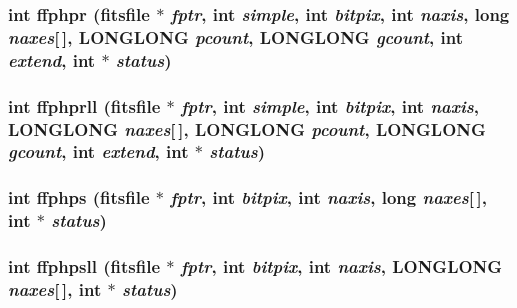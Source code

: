 \subsubsection{\setlength{\rightskip}{0pt plus 5cm}int ffphpr (\bf{fitsfile} $\ast$ {\em fptr}, int {\em simple}, int {\em bitpix}, int {\em naxis}, long {\em naxes}[$\,$], \bf{LONGLONG} {\em pcount}, \bf{LONGLONG} {\em gcount}, int {\em extend}, int $\ast$ {\em status})}\label{test_2shm__client_2fitsio_8h_9ecd5651c69ef6598a8595041c8cc95d}


\subsubsection{\setlength{\rightskip}{0pt plus 5cm}int ffphprll (\bf{fitsfile} $\ast$ {\em fptr}, int {\em simple}, int {\em bitpix}, int {\em naxis}, \bf{LONGLONG} {\em naxes}[$\,$], \bf{LONGLONG} {\em pcount}, \bf{LONGLONG} {\em gcount}, int {\em extend}, int $\ast$ {\em status})}\label{test_2shm__client_2fitsio_8h_8e5d505b66eaf3eb8a80be304d7c90eb}


\subsubsection{\setlength{\rightskip}{0pt plus 5cm}int ffphps (\bf{fitsfile} $\ast$ {\em fptr}, int {\em bitpix}, int {\em naxis}, long {\em naxes}[$\,$], int $\ast$ {\em status})}\label{test_2shm__client_2fitsio_8h_bf45c383dfb1d96dce837170d0b83600}


\subsubsection{\setlength{\rightskip}{0pt plus 5cm}int ffphpsll (\bf{fitsfile} $\ast$ {\em fptr}, int {\em bitpix}, int {\em naxis}, \bf{LONGLONG} {\em naxes}[$\,$], int $\ast$ {\em status})}\label{test_2shm__client_2fitsio_8h_aaefbdbf8f11e0fa90741e5163f6f82a}


